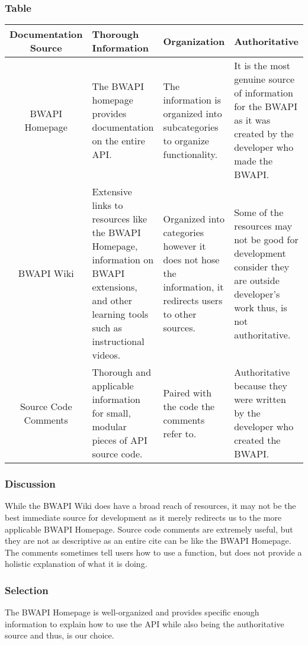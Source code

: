 \documentclass[10pt,letterpaper,onecolumn,draftclsnofoot]{IEEEtran}
\begin{document}
\subsubsection{Table}
\begin{center}
	\begin{tabular}{ ||C|M|M|M|| } 
		\hline
		Documentation Source & Thorough Information & Organization & Authoritative \\
		\hline
		BWAPI Homepage & The BWAPI homepage provides documentation on the entire API. & The information is organized into subcategories to organize functionality. & It is the most genuine source of information for the BWAPI as it was created by the developer who made the BWAPI. \\ 
		\hline
		BWAPI Wiki & Extensive links to resources like the BWAPI Homepage, information on BWAPI extensions, and other learning tools such as instructional videos. & Organized into categories however it does not hose the information, it redirects users to other sources. & Some of the resources may not be good for development consider they are outside developer's work thus, is not authoritative.  \\ 
		\hline
		Source Code Comments & Thorough and applicable information for small, modular pieces of API source code. & Paired with the code the comments refer to. & Authoritative because they were written by the developer who created the BWAPI. \\ 
		\hline
	\end{tabular}
\end{center}
\subsubsection{Discussion}
While the BWAPI Wiki does have a broad reach of resources, it may not be the best immediate source for development as it merely redirects us to the more applicable BWAPI Homepage. Source code comments are extremely useful, but they are not as descriptive as an entire cite can be like the BWAPI Homepage. The comments sometimes tell users how to use a function, but does not provide a holistic explanation of what it is doing.
\subsubsection{Selection}
The BWAPI Homepage is well-organized and provides specific enough information to explain how to use the API while also being the authoritative source and thus, is our choice.
\end{document}
